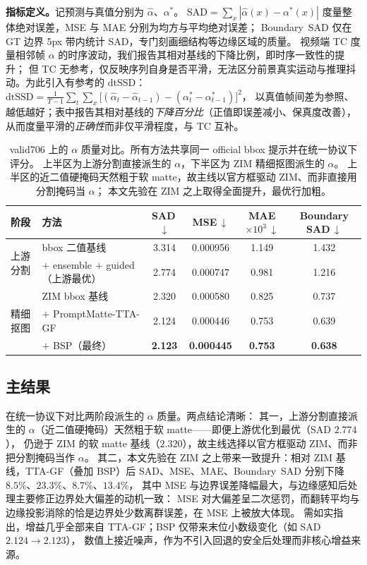 \documentclass[final]{cvpr}
\begin{document}
\noindent\textbf{指标定义。}记预测与真值分别为 $\hat\alpha$、$\alpha^*$。
$\mathrm{SAD}=\sum_x|\hat\alpha(x)-\alpha^*(x)|$ 度量整体绝对误差，MSE 与 MAE 分别为均方与平均绝对误差；
Boundary~SAD 仅在 GT 边界 5px 带内统计 SAD，专门刻画细结构等边缘区域的质量。
视频端 TC 度量相邻帧 $\alpha$ 的时序波动，我们报告其相对基线的下降比例，即时序一致性的提升；
但 TC 无参考，仅反映序列自身是否平滑，无法区分前景真实运动与推理抖动。为此引入有参考的 dtSSD：
$\mathrm{dtSSD}=\frac{1}{T-1}\sum_t\sum_x\big[(\hat\alpha_t-\hat\alpha_{t-1})-(\alpha^*_t-\alpha^*_{t-1})\big]^2$，
以真值帧间差为参照、越低越好；表中报告其相对基线的\emph{下降百分比}（正值即误差减小、保真度改善），
从而度量平滑的\emph{正确性}而非仅平滑程度，与 TC 互补。

\begin{table}[t]
\centering
\caption{valid706 上的 $\alpha$ 质量对比。所有方法共享同一 official bbox 提示并在统一协议下评分。
上半区为上游分割直接派生的 $\alpha$，下半区为 ZIM 精细抠图派生的 $\alpha$。
上半区的近二值硬掩码天然粗于软 matte，故主线以官方框驱动 ZIM、而非直接用分割掩码当 $\alpha$；
本文先验在 ZIM 之上取得全面提升，最优行加粗。}
\label{tab:main}
\setlength{\tabcolsep}{7pt}
\begin{tabular}{@{}llcccc@{}}
\toprule
阶段 & 方法 & SAD\,$\downarrow$ & MSE\,$\downarrow$ & MAE$\times10^3$\,$\downarrow$ & Boundary SAD\,$\downarrow$ \\
\midrule
\multirow{2}{*}{上游分割}
 & bbox 二值基线 & 3.314 & 0.000956 & 1.149 & 1.432 \\
 & \quad$+$ ensemble $+$ guided（上游最优） & 2.774 & 0.000747 & 0.981 & 1.216 \\
\midrule
\multirow{3}{*}{精细抠图}
 & ZIM bbox 基线 & 2.320 & 0.000580 & 0.825 & 0.737 \\
 & \quad$+$ PromptMatte-TTA-GF & 2.124 & 0.000446 & 0.753 & 0.639 \\
 & \quad$+$ BSP（最终） & \textbf{2.123} & \textbf{0.000445} & \textbf{0.753} & \textbf{0.638} \\
\bottomrule
\end{tabular}
\end{table}

\subsection{主结果}
\label{sec:exp-main}
 在统一协议下对比两阶段派生的 $\alpha$ 质量。两点结论清晰：
其一，上游分割直接派生的 $\alpha$（近二值硬掩码）天然粗于软 matte——即便上游优化到最优（SAD $2.774$），
仍逊于 ZIM 的软 matte 基线（$2.320$），故主线选择以官方框驱动 ZIM、而非把分割掩码当作 $\alpha$。
其二，本文先验在 ZIM 之上带来一致提升：相对 ZIM 基线，TTA-GF（叠加 BSP）后
SAD、MSE、MAE、Boundary~SAD 分别下降 $8.5\%$、$23.3\%$、$8.7\%$、$13.4\%$，
其中 MSE 与边界误差降幅最大，与边缘感知后处理主要修正边界处大偏差的动机一致：
MSE 对大偏差呈二次惩罚，而翻转平均与边缘投影消除的恰是边界处少数离群误差，在 MSE 上被放大体现。
需如实指出，增益几乎全部来自 TTA-GF；BSP 仅带来末位小数级变化（如 SAD $2.124\!\to\!2.123$），
数值上接近噪声，作为不引入回退的安全后处理而非核心增益来源。
\end{document}
